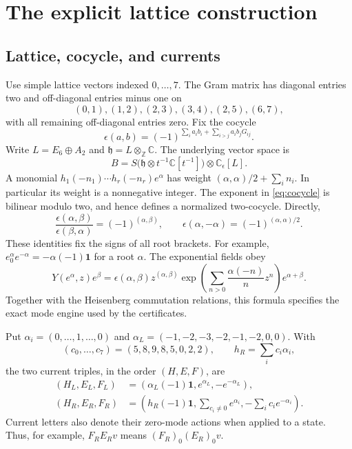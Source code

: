 \documentclass[11pt,a4paper]{article}
\theoremstyle{definition}
\newcommand{\CC}{\mathbb C}
\newcommand{\ZZ}{\mathbb Z}
\newcommand{\one}{\mathbf1}
\begin{document}






\appendix
\section{The explicit lattice construction}\label{sec:construction}
\subsection{Lattice, cocycle, and currents}
Use simple lattice vectors indexed \(0,\ldots,7\). The Gram matrix
has diagonal entries two and off-diagonal entries minus one on
\[
 (0,1),(1,2),(2,3),(3,4),(2,5),(6,7),
\]
with all remaining off-diagonal entries zero. Fix the cocycle
\begin{equation}\label{eq:cocycle}
 \epsilon(a,b)=(-1)^{\sum_i a_i b_i+
                      \sum_{i>j}a_i b_jG_{ij}}.
\end{equation}
Write $L=E_6\oplus A_2$ and $\mathfrak h=L\otimes_{\ZZ}\CC$.
The underlying vector space is
\[
 B=S\bigl(\mathfrak h\otimes t^{-1}\CC[t^{-1}]\bigr)
       \otimes\CC_\epsilon[L].
\]
A monomial $h_1(-n_1)\cdots h_r(-n_r)e^\alpha$ has weight
$(\alpha,\alpha)/2+\sum_i n_i$. In particular its weight is a
nonnegative integer. The exponent in \eqref{eq:cocycle} is bilinear
modulo two, and hence defines a normalized two-cocycle. Directly,
\[
 \frac{\epsilon(\alpha,\beta)}{\epsilon(\beta,\alpha)}
       =(-1)^{(\alpha,\beta)},\qquad
 \epsilon(\alpha,-\alpha)=(-1)^{(\alpha,\alpha)/2}.
\]
These identities fix the signs of all root brackets. For example,
$e^\alpha_0e^{-\alpha}=-\alpha(-1)\one$ for a root $\alpha$.
The exponential fields obey
\begin{equation}\label{eq:lattice-product}
 Y(e^\alpha,z)e^\beta
 =\epsilon(\alpha,\beta)z^{(\alpha,\beta)}
   \exp\!\left(\sum_{n>0}\frac{\alpha(-n)}{n}z^n\right)e^{\alpha+\beta}.
\end{equation}
Together with the Heisenberg commutation relations, this formula
specifies the exact mode engine used by the certificates.

Put $\alpha_i=(0,\ldots,1,\ldots,0)$ and
$\alpha_L=(-1,-2,-3,-2,-1,-2,0,0)$. With
\[
 (c_0,\ldots,c_7)=(5,8,9,8,5,0,2,2),\qquad
 h_R=\sum_i c_i\alpha_i,
\]
the two current triples, in the order $(H,E,F)$, are
\begin{align}
 (H_L,E_L,F_L)&=
   (\alpha_L(-1)\one,e^{\alpha_L},-e^{-\alpha_L}),\label{eq:leftcurrents}\\
 (H_R,E_R,F_R)&=
   \left(h_R(-1)\one,\sum_{c_i\ne0}e^{\alpha_i},
                    -\sum_i c_i e^{-\alpha_i}\right).
                    \label{eq:rightcurrents}
\end{align}
Current letters also denote their zero-mode actions when applied to
a state. Thus, for example, $F_RE_Rv$ means
$(F_R)_0(E_R)_0v$.
\end{document}
